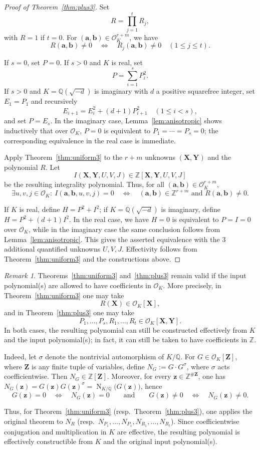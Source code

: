 \documentclass[12pt]{amsart}
\numberwithin{equation}{section}
\theoremstyle{remark}
\newtheorem{remark}[theorem]{Remark}
\theoremstyle{plain}
\newcommand{\Z}{\mathbb{Z}}
\newcommand{\Q}{\mathbb{Q}}
\newcommand{\sO}{\mathcal{O}}
\newcommand{\bX}{\mathbf{X}}
\newcommand{\bY}{\mathbf{Y}}
\newcommand{\bZ}{\mathbf{Z}}
\newcommand{\bz}{\mathbf{z}}
\newcommand{\ba}{\mathbf{a}}
\newcommand{\bb}{\mathbf{b}}
\newcommand{\Norm}{\operatorname{N}}
\begin{document}
\begin{proof}[Proof of Theorem~\ref{thm:plus3}]
Set
\[
R=\prod_{j=1}^{t}R_j,
\]
with $R=1$ if $t=0$. For $(\ba,\bb)\in\sO_K^{r+m}$, we have
\[
R(\ba,\bb)\neq0\quad\Longleftrightarrow\quad R_j(\ba,\bb)\neq0\quad(1\leq j\leq t).
\]

If $s=0$, set $P=0$. If $s>0$ and $K$ is real, set
\[
P=\sum_{i=1}^{s}P_i^2.
\]
If $s>0$ and $K=\Q(\sqrt{-d})$ is imaginary with $d$ a positive squarefree integer, set $E_1=P_1$ and recursively
\[
E_{i+1}=E_i^2+(d+1)P_{i+1}^2\quad(1\leq i<s),
\]
and set $P=E_s$. In the imaginary case, Lemma~\ref{lem:anisotropic} shows inductively that over $\sO_K$, $P=0$ is equivalent to $P_1=\cdots=P_s=0$; the corresponding equivalence in the real case is immediate.

Apply Theorem~\ref{thm:uniform3} to the $r+m$ unknowns $(\bX,\bY)$ and the polynomial $R$. Let
\[
I(\bX,\bY,U,V,J)\in\Z[\bX,\bY,U,V,J]
\]
be the resulting integrality polynomial. Thus, for all $(\ba,\bb)\in\sO_K^{r+m}$,
\[
\exists u,v,j\in\sO_K\colon\ I(\ba,\bb,u,v,j)=0\quad\Longleftrightarrow\quad(\ba,\bb)\in\Z^{r+m}\text{ and }R(\ba,\bb)\neq0.
\]

If $K$ is real, define $H=P^2+I^2$; if $K=\Q(\sqrt{-d})$ is imaginary, define $H=P^2+(d+1)I^2$. In the real case, we have $H=0$ is equivalent to $P=I=0$ over $\sO_K$, while in the imaginary case the same conclusion follows from Lemma~\ref{lem:anisotropic}. This gives the asserted equivalence with the $3$ additional quantified unknowns $U,V,J$. Effectivity follows from Theorem~\ref{thm:uniform3} and the constructions above.
\end{proof}

\begin{remark}\label{rmk:OKcoeff}
Theorems~\ref{thm:uniform3} and~\ref{thm:plus3} remain valid if the input polynomial(s) are allowed to have coefficients in $\sO_K$. More precisely, in Theorem~\ref{thm:uniform3} one may take
\[
R(\bX)\in\sO_K[\bX],
\]
and in Theorem~\ref{thm:plus3} one may take
\[
P_1,\ldots,P_s,R_1,\ldots,R_t\in\sO_K[\bX,\bY].
\]
In both cases, the resulting polynomial can still be constructed effectively from $K$ and the input polynomial(s); in fact, it can still be taken to have coefficients in $\Z$.

Indeed, let $\sigma$ denote the nontrivial automorphism of $K/\Q$. For $G\in\sO_K[\bZ]$, where $\bZ$ is any finite tuple of variables, define $N_G:=G\cdot G^\sigma$, where $\sigma$ acts coefficientwise. Then $N_G\in\Z[\bZ]$. Moreover, for every $\bz\in\Z^{\#\bZ}$, one has $N_G(\bz)=G(\bz)G(\bz)^\sigma=\Norm_{K/\Q}\bigl(G(\bz)\bigr)$, hence
\[
G(\bz)=0\quad\Longleftrightarrow\quad N_G(\bz)=0\qquad\text{and}\qquad G(\bz)\neq0\quad\Longleftrightarrow\quad N_G(\bz)\neq0.
\]

Thus, for Theorem~\ref{thm:uniform3} (resp.~Theorem~\ref{thm:plus3}), one applies the original theorem to $N_R$ (resp.~$N_{P_1},\ldots,N_{P_s},N_{R_1},\ldots,N_{R_t}$). Since coefficientwise conjugation and multiplication in $K$ are effective, the resulting polynomial is effectively constructible from $K$ and the original input polynomial(s).
\end{remark}
\end{document}
